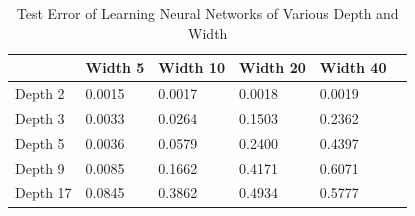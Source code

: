 \begin{table}
\vskip 0.1in
\begin{center}
\begin{small}
\begin{sc}
\begin{tabular}{
  |p{}|%
   |p{}%
  |p{}%
  |p{}%
  |p{}%
   |p{}%
  }
   \hline 
           & Width 5   &  Width 10   & Width 20 & Width 40     \\ \hline 
    Depth 2 & 0.0015   & 0.0017      &   0.0018 & 0.0019 \\ \hline
    Depth 3 & 0.0033   & 0.0264        &   0.1503 & 0.2362 \\ \hline
    Depth 5 & 0.0036   & 0.0579        &   0.2400 & 0.4397 \\ \hline
    Depth 9 & 0.0085   & 0.1662        &   0.4171 & 0.6071 \\ \hline
    Depth 17 & 0.0845   & 0.3862        &   0.4934 & 0.5777 \\ \hline
\end{tabular}
\end{sc}
\end{small}
\end{center}
\caption{Test Error of Learning Neural Networks of Various Depth and Width}
\vskip -0.1in
\end{table}





